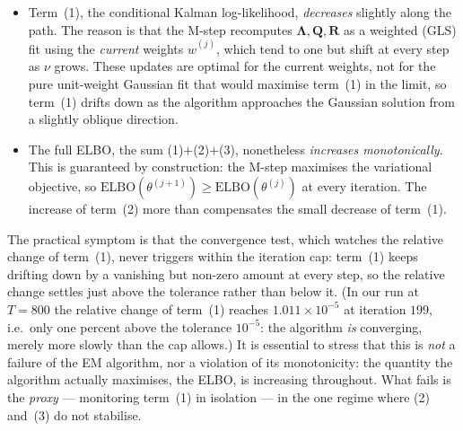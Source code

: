\documentclass[11pt, a4paper, oneside]{article}
\begin{document}
\begin{itemize}[leftmargin=1.5em, itemsep=3pt]
\[        T\!\left[\tfrac{1}{2}\log\tfrac{\nu_u}{2}
        - \tfrac{1}{2}\log(2\pi)\right] + O(1)
        \;=\;
        \tfrac{T}{2}\log\nu_u + O(1).
        \]
        This term is strictly increasing in $\nu_u$ and unbounded:
        every increase in $\nu$ raises the ELBO through this channel.
        It is precisely the force that drives the M-step to push $\nu$
        upward on Gaussian data --- the algorithm climbs the ELBO by
        sending the degrees of freedom toward infinity, as it should
        when there are no heavy tails to detect.
  \item Term~(1), the conditional Kalman log-likelihood,
        \emph{decreases} slightly along the path. The reason is that
        the M-step recomputes $\boldsymbol{\Lambda}, \mathbf{Q},
        \mathbf{R}$ as a weighted (GLS) fit using the \emph{current}
        weights $\hat{w}^{(j)}$, which tend to one but shift at every
        step as $\nu$ grows. These updates are optimal for the
        current weights, not for the pure unit-weight Gaussian fit
        that would maximise term~(1) in the limit, so term~(1) drifts
        down as the algorithm approaches the Gaussian solution from a
        slightly oblique direction.
  \item The full ELBO, the sum (1)$+$(2)$+$(3), nonetheless
        \emph{increases monotonically}. This is guaranteed by
        construction: the M-step maximises the variational objective,
        so $\mathrm{ELBO}(\theta^{(j+1)}) \ge
        \mathrm{ELBO}(\theta^{(j)})$ at every iteration. The increase
        of term~(2) more than compensates the small decrease of
        term~(1).
\end{itemize}
The practical symptom is that the convergence test, which watches the
relative change of term~(1), never triggers within the iteration cap:
term~(1) keeps drifting down by a vanishing but non-zero amount at
every step, so the relative change settles just above the tolerance
rather than below it. (In our run at $T=800$ the relative change of
term~(1) reaches $1.011\times 10^{-5}$ at iteration $199$, i.e.\ only
one percent above the tolerance $10^{-5}$: the algorithm \emph{is}
converging, merely more slowly than the cap allows.) It is essential
to stress that this is \emph{not} a failure of the EM algorithm, nor
a violation of its monotonicity: the quantity the algorithm actually
maximises, the ELBO, is increasing throughout. What fails is the
\emph{proxy} --- monitoring term~(1) in isolation --- in the one
regime where (2) and~(3) do not stabilise.
\end{document}
